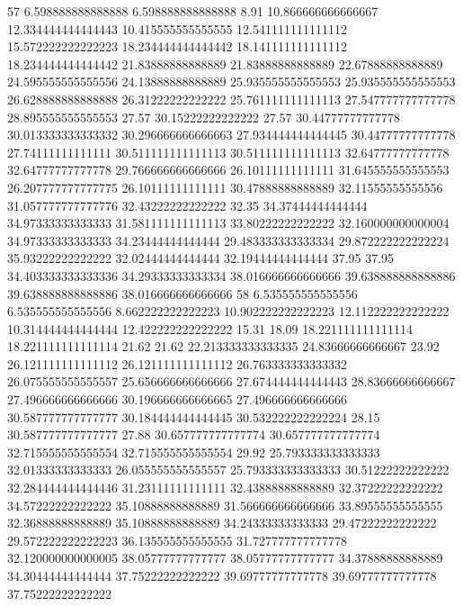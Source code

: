 57 6.598888888888888 6.598888888888888 8.91 10.866666666666667 12.334444444444443 10.415555555555555 12.541111111111112 15.572222222222223 18.234444444444442 18.141111111111112 18.234444444444442 21.83888888888889 21.83888888888889 22.67888888888889 24.595555555555556 24.13888888888889 25.935555555555553 25.935555555555553 26.628888888888888 26.31222222222222 25.761111111111113 27.547777777777778 28.895555555555553 27.57 30.15222222222222 27.57 30.44777777777778 30.013333333333332 30.296666666666663 27.934444444444445 30.44777777777778 27.74111111111111 30.511111111111113 30.511111111111113 32.64777777777778 32.64777777777778 29.766666666666666 26.10111111111111 31.645555555555553 26.207777777777775 26.10111111111111 30.47888888888889 32.11555555555556 31.057777777777776 32.43222222222222 32.35 34.37444444444444 34.97333333333333 31.581111111111113 33.80222222222222 32.160000000000004 34.97333333333333 34.23444444444444 29.483333333333334 29.872222222222224 35.93222222222222 32.02444444444444 32.19444444444444 37.95 37.95 34.403333333333336 34.29333333333334 38.016666666666666 39.638888888888886 39.638888888888886 38.016666666666666
58 6.535555555555556 6.535555555555556 8.662222222222223 10.902222222222223 12.112222222222222 10.314444444444444 12.422222222222222 15.31 18.09 18.221111111111114 18.221111111111114 21.62 21.62 22.213333333333335 24.83666666666667 23.92 26.121111111111112 26.121111111111112 26.763333333333332 26.075555555555557 25.656666666666666 27.674444444444443 28.83666666666667 27.496666666666666 30.196666666666665 27.496666666666666 30.587777777777777 30.184444444444445 30.532222222222224 28.15 30.587777777777777 27.88 30.657777777777774 30.657777777777774 32.715555555555554 32.715555555555554 29.92 25.793333333333333 32.01333333333333 26.055555555555557 25.793333333333333 30.51222222222222 32.284444444444446 31.23111111111111 32.43888888888889 32.37222222222222 34.57222222222222 35.10888888888889 31.566666666666666 33.89555555555555 32.36888888888889 35.10888888888889 34.24333333333333 29.47222222222222 29.572222222222223 36.135555555555555 31.727777777777778 32.120000000000005 38.05777777777777 38.05777777777777 34.37888888888889 34.30444444444444 37.75222222222222 39.69777777777778 39.69777777777778 37.75222222222222
